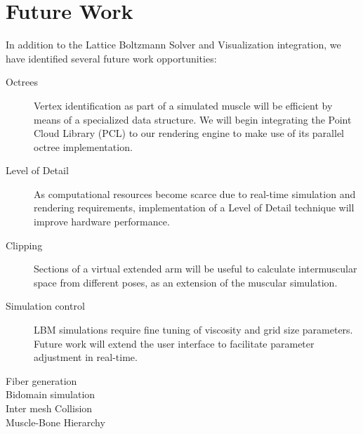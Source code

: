 
\section{Future Work}
\label{sec:futureWork}
In addition to the Lattice Boltzmann Solver and Visualization integration, we have identified several future work opportunities:

\begin{description}
\item[Octrees]
Vertex identification as part of a simulated muscle will be efficient by means of a specialized data structure. We will begin integrating the Point Cloud Library (PCL) to our rendering engine to make use of its parallel octree implementation.
\item[Level of Detail]
As computational resources become scarce due to real-time simulation and rendering requirements, implementation of a Level of Detail technique will improve hardware performance.
\item[Clipping]
Sections of a virtual extended arm will be useful to calculate intermuscular space from different poses, as an extension of the muscular simulation.
\item[Simulation control]
LBM simulations require fine tuning of viscosity and grid size parameters. Future work will extend the user interface to facilitate parameter adjustment in real-time.
\item[Fiber generation]
\item[Bidomain simulation]
\item[Inter mesh Collision]
\item[Muscle-Bone Hierarchy]
\end{description}